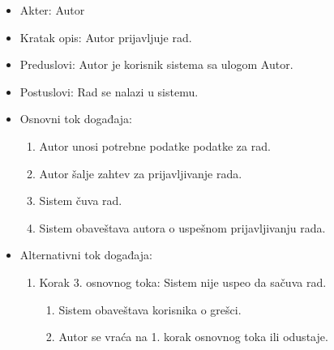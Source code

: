 \documentclass[a4paper]{article}
\begin{document}
\begin{itemize}
    \item Akter: Autor
    \item Kratak opis: Autor prijavljuje rad.
    \item Preduslovi: Autor je korisnik sistema sa ulogom Autor.
    \item Postuslovi: Rad se nalazi u sistemu.
    \item Osnovni tok događaja:
        \begin{enumerate}
            \item Autor unosi potrebne podatke podatke za rad.
            \item Autor šalje zahtev za prijavljivanje rada.
            \item Sistem čuva rad.
            \item Sistem obaveštava autora o uspešnom prijavljivanju rada.
        \end{enumerate}
    \item Alternativni tok događaja:
        \begin{enumerate}
            \item Korak 3. osnovnog toka: Sistem nije uspeo da sačuva rad.
            \begin{enumerate}
                \item Sistem obaveštava korisnika o grešci.
                \item Autor se vraća na 1. korak osnovnog toka ili odustaje.
            \end{enumerate}
        \end{enumerate}
\end{itemize}
\end{document}
